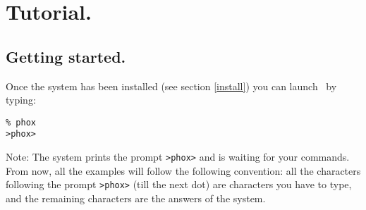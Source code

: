 


\chapter{Tutorial.}

\section{Getting started.}

Once the system has been installed (see section \ref{install}) you can launch 
\AFD\ by typing:
\begin{verbatim}
% phox
>phox> 
\end{verbatim}

Note: The system prints the prompt {\tt >phox>} and is waiting for your
commands. From now, all the examples will follow the following convention: all
the characters following the prompt {\tt >phox>} (till the next dot) are
characters you have to type, and the remaining characters are the answers of
the system.


\ifx\undefined\principal\expandafter\enddocument\fi

